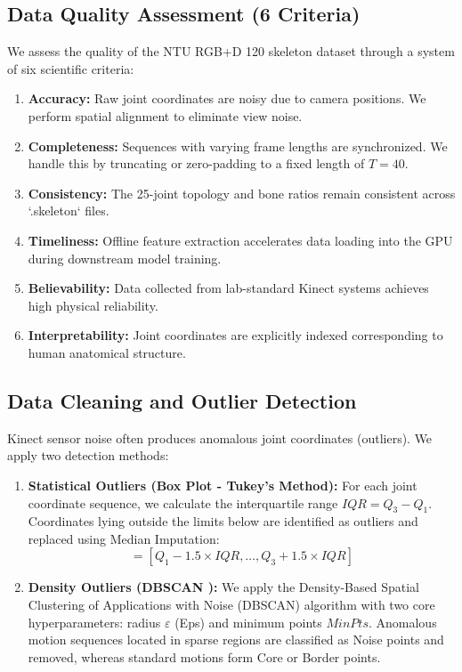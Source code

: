 \documentclass[conference]{IEEEtran}
\begin{document}
\subsection{Data Quality Assessment (6 Criteria)}
We assess the quality of the NTU RGB+D 120 skeleton dataset through a system of six scientific criteria:
\begin{enumerate}
    \item \textbf{Accuracy:} Raw joint coordinates are noisy due to camera positions. We perform spatial alignment to eliminate view noise.
    \item \textbf{Completeness:} Sequences with varying frame lengths are synchronized. We handle this by truncating or zero-padding to a fixed length of $T = 40$.
    \item \textbf{Consistency:} The 25-joint topology and bone ratios remain consistent across `.skeleton` files.
    \item \textbf{Timeliness:} Offline feature extraction accelerates data loading into the GPU during downstream model training.
    \item \textbf{Believability:} Data collected from lab-standard Kinect systems achieves high physical reliability.
    \item \textbf{Interpretability:} Joint coordinates are explicitly indexed corresponding to human anatomical structure.
\end{enumerate}

\subsection{Data Cleaning and Outlier Detection}
Kinect sensor noise often produces anomalous joint coordinates (outliers). We apply two detection methods:
\begin{enumerate}
    \item \textbf{Statistical Outliers (Box Plot - Tukey's Method):} For each joint coordinate sequence, we calculate the interquartile range $IQR = Q_3 - Q_1$. Coordinates lying outside the limits below are identified as outliers and replaced using Median Imputation:
    \begin{equation}
    [\text{Lower}, \text{Upper}] = [Q_1 - 1.5 \times IQR, \dots, Q_3 + 1.5 \times IQR]
    \end{equation}
    \item \textbf{Density Outliers (DBSCAN \cite{b12}):} We apply the Density-Based Spatial Clustering of Applications with Noise (DBSCAN) algorithm with two core hyperparameters: radius $\varepsilon$ (Eps) and minimum points $MinPts$. Anomalous motion sequences located in sparse regions are classified as Noise points and removed, whereas standard motions form Core or Border points.
\end{enumerate}
\end{document}
